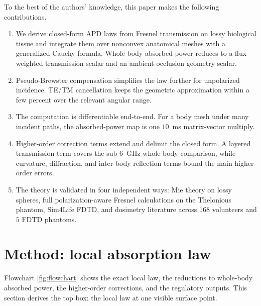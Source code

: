 \documentclass[journal,twocolumn,10pt]{IEEEtran}
\theoremstyle{plain}
\begin{document}
To the best of the authors' knowledge, this paper makes the following
contributions.
\begin{enumerate}
  \item We derive closed-form \gls{APD} laws from Fresnel transmission
  on lossy biological tissue and integrate them over nonconvex
  anatomical meshes with a generalized Cauchy formula. Whole-body
  absorbed power reduces to a flux-weighted transmission scalar and an
  ambient-occlusion geometry scalar.

  \item Pseudo-Brewster compensation simplifies the law further for
  unpolarized incidence. \gls{TE}/\gls{TM} cancellation keeps the
  geometric approximation within a few percent over the relevant
  angular range.

  \item The computation is differentiable end-to-end. For a body mesh
  under many incident paths, the absorbed-power map is one $10$~ms
  matrix-vector multiply.

  \item Higher-order correction terms extend and delimit the closed
  form. A layered transmission term covers the sub-6~GHz whole-body
  comparison, while curvature, diffraction, and inter-body reflection
  terms bound the main higher-order errors.

  \item The theory is validated in four independent ways: Mie theory
  on lossy spheres, full polarization-aware Fresnel calculations on
  the Thelonious phantom, Sim4Life FDTD, and dosimetry literature
  across $168$ volunteers and $5$ FDTD phantoms.
\end{enumerate}

\section{Method: local absorption law}\label{sec:law}

Flowchart \ref{fig:flowchart} shows the exact local law, the
reductions to whole-body absorbed power, the higher-order
corrections, and the regulatory outputs. This section derives the top
box: the local law at one visible surface point.
\end{document}
